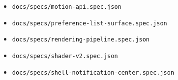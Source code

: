 \begin{itemize}
\item
  \texttt{d\allowbreak{}o\allowbreak{}c\allowbreak{}s\allowbreak{}/\allowbreak{}s\allowbreak{}p\allowbreak{}e\allowbreak{}c\allowbreak{}s\allowbreak{}/\allowbreak{}m\allowbreak{}o\allowbreak{}t\allowbreak{}i\allowbreak{}o\allowbreak{}n\allowbreak{}-\allowbreak{}a\allowbreak{}p\allowbreak{}i\allowbreak{}.\allowbreak{}s\allowbreak{}p\allowbreak{}e\allowbreak{}c\allowbreak{}.\allowbreak{}j\allowbreak{}s\allowbreak{}o\allowbreak{}n}
\item
  \texttt{d\allowbreak{}o\allowbreak{}c\allowbreak{}s\allowbreak{}/\allowbreak{}s\allowbreak{}p\allowbreak{}e\allowbreak{}c\allowbreak{}s\allowbreak{}/\allowbreak{}p\allowbreak{}r\allowbreak{}e\allowbreak{}f\allowbreak{}e\allowbreak{}r\allowbreak{}e\allowbreak{}n\allowbreak{}c\allowbreak{}e\allowbreak{}-\allowbreak{}l\allowbreak{}i\allowbreak{}s\allowbreak{}t\allowbreak{}-\allowbreak{}s\allowbreak{}u\allowbreak{}r\allowbreak{}f\allowbreak{}a\allowbreak{}c\allowbreak{}e\allowbreak{}.\allowbreak{}s\allowbreak{}p\allowbreak{}e\allowbreak{}c\allowbreak{}.\allowbreak{}j\allowbreak{}s\allowbreak{}o\allowbreak{}n}
\item
  \texttt{d\allowbreak{}o\allowbreak{}c\allowbreak{}s\allowbreak{}/\allowbreak{}s\allowbreak{}p\allowbreak{}e\allowbreak{}c\allowbreak{}s\allowbreak{}/\allowbreak{}r\allowbreak{}e\allowbreak{}n\allowbreak{}d\allowbreak{}e\allowbreak{}r\allowbreak{}i\allowbreak{}n\allowbreak{}g\allowbreak{}-\allowbreak{}p\allowbreak{}i\allowbreak{}p\allowbreak{}e\allowbreak{}l\allowbreak{}i\allowbreak{}n\allowbreak{}e\allowbreak{}.\allowbreak{}s\allowbreak{}p\allowbreak{}e\allowbreak{}c\allowbreak{}.\allowbreak{}j\allowbreak{}s\allowbreak{}o\allowbreak{}n}
\item
  \texttt{d\allowbreak{}o\allowbreak{}c\allowbreak{}s\allowbreak{}/\allowbreak{}s\allowbreak{}p\allowbreak{}e\allowbreak{}c\allowbreak{}s\allowbreak{}/\allowbreak{}s\allowbreak{}h\allowbreak{}a\allowbreak{}d\allowbreak{}e\allowbreak{}r\allowbreak{}-\allowbreak{}v\allowbreak{}2\allowbreak{}.\allowbreak{}s\allowbreak{}p\allowbreak{}e\allowbreak{}c\allowbreak{}.\allowbreak{}j\allowbreak{}s\allowbreak{}o\allowbreak{}n}
\item
  \texttt{d\allowbreak{}o\allowbreak{}c\allowbreak{}s\allowbreak{}/\allowbreak{}s\allowbreak{}p\allowbreak{}e\allowbreak{}c\allowbreak{}s\allowbreak{}/\allowbreak{}s\allowbreak{}h\allowbreak{}e\allowbreak{}l\allowbreak{}l\allowbreak{}-\allowbreak{}n\allowbreak{}o\allowbreak{}t\allowbreak{}i\allowbreak{}f\allowbreak{}i\allowbreak{}c\allowbreak{}a\allowbreak{}t\allowbreak{}i\allowbreak{}o\allowbreak{}n\allowbreak{}-\allowbreak{}c\allowbreak{}e\allowbreak{}n\allowbreak{}t\allowbreak{}e\allowbreak{}r\allowbreak{}.\allowbreak{}s\allowbreak{}p\allowbreak{}e\allowbreak{}c\allowbreak{}.\allowbreak{}j\allowbreak{}s\allowbreak{}o\allowbreak{}n}

\end{itemize}
